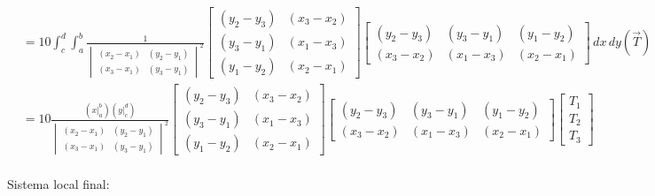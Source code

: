 \documentclass[10pt]{article}
\begin{document}
\begin{align*}
&= 10 \int_{c}^{d} \int_{a}^{b} 
\frac{1}{\begin{vmatrix}
(x_2-x_1) & (y_2-y_1) \\
(x_3-x_1) & (y_3-y_1)
\end{vmatrix}^2} \begin{bmatrix}
(y_2 - y_3) & (x_3 - x_2)\\
 (y_3-y_1) & (x_1-x_3) \\
 (y_1-y_2) & (x_2-x_1)
\end{bmatrix} \begin{bmatrix}
(y_2 - y_3) & (y_3-y_1) & (y_1-y_2) \\
(x_3 - x_2) & (x_1-x_3) & (x_2-x_1)
\end{bmatrix}
 \,d x \,d y (\vec{T}) \\
&= 10 \frac{(x\Big|_a^b)(y\Big|_c^d)}{\begin{vmatrix}
(x_2-x_1) & (y_2-y_1) \\
(x_3-x_1) & (y_3-y_1)
\end{vmatrix}^2} \begin{bmatrix}
(y_2 - y_3) & (x_3 - x_2)\\
 (y_3-y_1) & (x_1-x_3) \\
 (y_1-y_2) & (x_2-x_1)
\end{bmatrix} \begin{bmatrix}
(y_2 - y_3) & (y_3-y_1) & (y_1-y_2) \\
(x_3 - x_2) & (x_1-x_3) & (x_2-x_1)
\end{bmatrix} \begin{bmatrix}
T_1 \\ T_2 \\ T_3
\end{bmatrix}
\end{align*}\\
Sistema local final: \\
\end{document}
